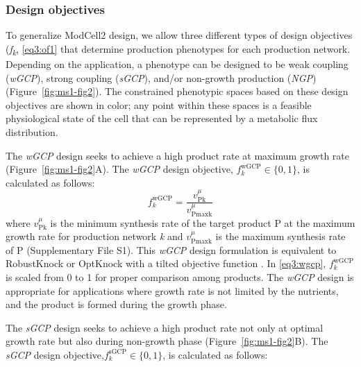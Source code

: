\subsubsection{Design objectives} To generalize ModCell2 design, we allow
three different types of design objectives (\emph{f\textsubscript{k}},
\eqref{eq3:of1} that determine production phenotypes for each production
network. Depending on the application, a phenotype can be designed to be
weak coupling (\emph{wGCP}), strong coupling (\emph{sGCP}), and/or
non-growth production (\emph{NGP}) (Figure~\ref{fig:ms1-fig2}). The constrained
phenotypic spaces based on these design objectives are shown in color;
any point within these spaces is a feasible physiological state of the
cell that can be represented by a metabolic flux distribution.

The \emph{wGCP} design seeks to achieve a high product rate at maximum growth rate (Figure~\ref{fig:ms1-fig2}A).
The \emph{wGCP} design objective, $f_{k}^{\text{wGCP}} \in \{0, 1\}$, is calculated as follows:
\begin{equation}
    f_{k}^{\text{wGCP}} = \frac{v_{\text{Pk}}^{\mu}}{v_{\text{Pmaxk}}^{\mu}} \label{eq3:wgcp}
\end{equation}
\noindent where \(v_{\text{Pk}}^{\mu}\) is the minimum synthesis rate of the target product P at the maximum growth rate for production network \emph{k} and \(v_{\text{Pmaxk}}^{\mu}\) is the maximum synthesis rate of P (Supplementary File S1).
This \emph{wGCP} design formulation is equivalent to RobustKnock \citep{tepper2010} or OptKnock with a tilted objective function \citep{burgard2003, feist2010, yang2011}.
In \eqref{eq3:wgcp}, \(f_{k}^{\text{wGCP}}\) is scaled from 0 to 1 for proper comparison among products.
The \emph{wGCP} design is appropriate for applications where growth rate is not limited by the nutrients, and the product is formed during the growth phase.

The \emph{sGCP} design seeks to achieve a high product rate not only at optimal growth rate but also during non-growth phase (Figure~\ref{fig:ms1-fig2}B).
The \emph{sGCP} design objective,$f_{k}^{\text{sGCP}} \in \{0, 1\}$, is calculated as follows:

